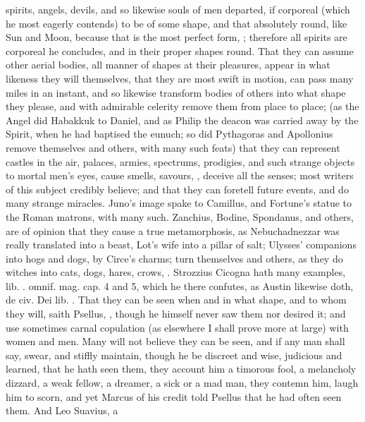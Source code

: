 {{spirits, angels, devils, and so likewise souls of men departed, if
corporeal (which he most eagerly contends) to be of some shape, and
that absolutely round, like Sun and Moon, because that is the most
perfect form, ; therefore all spirits are corporeal he
concludes, and in their proper shapes round. That they can assume other
aerial bodies, all manner of shapes at their pleasures, appear in what
likeness they will themselves, that they are most swift in motion, can
pass many miles in an instant, and so likewise transform bodies
of others into what shape they please, and with admirable celerity
remove them from place to place; (as the Angel did Habakkuk to Daniel,
and as Philip the deacon was carried away by the Spirit, when he had
baptised the eunuch; so did Pythagoras and Apollonius remove themselves
and others, with many such feats) that they can represent castles in
the air, palaces, armies, spectrums, prodigies, and such strange
objects to mortal men's eyes, cause smells, savours, \etc{}, deceive
all the senses; most writers of this subject credibly believe; and that
they can foretell future events, and do many strange miracles. Juno's
image spake to Camillus, and Fortune's statue to the Roman matrons,
with many such. Zanchius, Bodine, Spondanus, and others, are of opinion
that they cause a true metamorphosis, as Nebuchadnezzar was really
translated into a beast, Lot's wife into a pillar of salt; Ulysses'
companions into hogs and dogs, by Circe's charms; turn themselves and
others, as they do witches into cats, dogs, hares, crows, \etc{}. Strozzius
Cicogna hath many examples, lib. . omnif. mag. cap. 4 and 5, which
he there confutes, as Austin likewise doth, de civ. Dei lib. .
That they can be seen when and in what shape, and to whom they will,
saith Psellus, , though he
himself never saw them nor desired it; and use sometimes carnal
copulation (as elsewhere I shall prove more at large) with women
and men. Many will not believe they can be seen, and if any man shall
say, swear, and stiffly maintain, though he be discreet and wise,
judicious and learned, that he hath seen them, they account him a
timorous fool, a melancholy dizzard, a weak fellow, a dreamer, a sick
or a mad man, they contemn him, laugh him to scorn, and yet Marcus of
his credit told Psellus that he had often seen them. And Leo Suavius, a
}}
